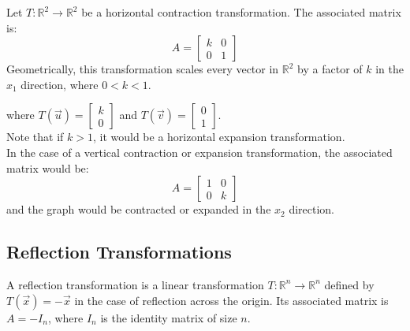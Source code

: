 \begin{eg}
    Let $T: \mathbb{R}^2 \to \mathbb{R}^2$ be a horizontal contraction transformation. The associated matrix is:
    \[
        A = \begin{bmatrix} k & 0 \\ 0 & 1 \end{bmatrix}
    \]
    Geometrically, this transformation scales every vector in $\mathbb{R}^2$ by a factor of $k$ in the $x_1$ direction, where $0 < k < 1$. \\
    \begin{center}
    \end{center}
    where $T(\vec{u}) = \begin{bmatrix} k \\ 0 \end{bmatrix}$ and $T(\vec{v}) = \begin{bmatrix} 0 \\ 1 \end{bmatrix}$. \\
    Note that if $k > 1$, it would be a horizontal expansion transformation. \\
    In the case of a vertical contraction or expansion transformation, the associated matrix would be:
    \[
        A = \begin{bmatrix} 1 & 0 \\ 0 & k \end{bmatrix}
    \]
    and the graph would be contracted or expanded in the $x_2$ direction.
\end{eg}

\subsection{Reflection Transformations}
\begin{definition}
    A reflection transformation is a linear transformation $T: \mathbb{R}^n \to \mathbb{R}^n$ defined by $T(\vec{x}) = -\vec{x}$ in the case of reflection across the origin. Its associated matrix is $A = -I_n$, where $I_n$ is the identity matrix of size $n$.
\end{definition}

